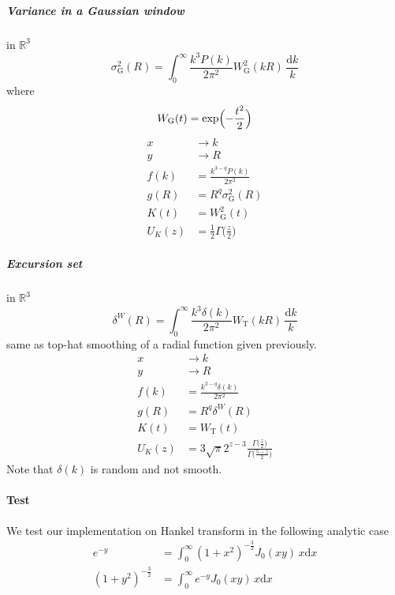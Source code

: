 \documentclass{article}
\renewcommand{\d}{\mathrm{d}}
\newcommand{\Mellin}{U}
\newcommand{\Tophat}{\mathrm{T}}
\newcommand{\Gauss}{\mathrm{G}}
\begin{document}
\subparagraph{Variance in a Gaussian window}
in $\mathbb{R}^3$
\begin{equation}
    \sigma_\Gauss^2(R) = \int_0^\infty \frac{k^3P(k)}{2\pi^2} W_\Gauss^2(kR) \,\frac{\d k}k
\end{equation}
where
\begin{equation}
    W_\Gauss(t) = \exp\Bigl(-\frac{t^2}2\Bigr)
\end{equation}
\begin{align}
    x &\to k \\
    y &\to R \\
    f(k) &= \frac{k^{3-q}P(k)}{2\pi^2} \\
    g(R) &= R^q \sigma_\Gauss^2(R) \\
    K(t) &= W_\Gauss^2(t) \\
    \Mellin_K(z) &= \frac12 \Gamma\bigl(\frac{z}2\bigr)
\end{align}


\subparagraph{Excursion set}
in $\mathbb{R}^3$
\begin{equation}
    \delta^W(R) = \int_0^\infty \frac{k^3\delta(k)}{2\pi^2} W_\Tophat(kR) \,\frac{\d k}k
\end{equation}
same as top-hat smoothing of a radial function given previously.
\begin{align}
    x &\to k \\
    y &\to R \\
    f(k) &= \frac{k^{3-q}\delta(k)}{2\pi^2} \\
    g(R) &= R^q \delta^W(R) \\
    K(t) &= W_\Tophat(t) \\
    \Mellin_K(z) &= 3\sqrt\pi 2^{z-3}
            \frac{\Gamma\bigl(\frac{z}2\bigr)}{\Gamma\bigl(\frac{5-z}2\bigr)}
\end{align}
Note that $\delta(k)$ is random and not smooth.


\paragraph{Test}
We test our implementation on Hankel transform in the following analytic case
\begin{align}
    e^{-y} &= \int_0^\infty (1+x^2)^{-\frac32} J_0(xy) \,x\d x \\
    (1+y^2)^{-\frac32} &= \int_0^\infty e^{-y} J_0(xy) \,x\d x
\end{align}
\end{document}
